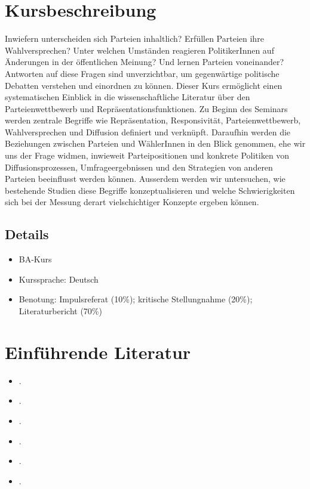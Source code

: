 \documentclass[abstract=on,parskip=full,headings=standardclasses,fontsize=11pt,paper=a4]{scrartcl}
\begin{document}
\section*{Kursbeschreibung}

Inwiefern unterscheiden sich Parteien inhaltlich? Erfüllen Parteien ihre Wahlversprechen? Unter welchen Umständen reagieren PolitikerInnen auf Änderungen in der öffentlichen Meinung? Und lernen Parteien voneinander? Antworten auf diese Fragen sind unverzichtbar, um gegenwärtige politische Debatten verstehen und einordnen zu können. Dieser Kurs ermöglicht einen systematischen Einblick in die wissenschaftliche Literatur über den Parteienwettbewerb und Repräsentationsfunktionen. Zu Beginn des Seminars werden zentrale Begriffe wie Repräsentation, Responsivität, Parteienwettbewerb, Wahlversprechen und Diffusion definiert und verknüpft. Daraufhin werden die Beziehungen zwischen Parteien und WählerInnen in den Blick genommen, ehe wir uns der Frage widmen, inwieweit Parteipositionen und konkrete Politiken von Diffusionsprozessen, Umfrageergebnissen und den Strategien von anderen Parteien beeinflusst werden können. Ausserdem werden wir untersuchen, wie bestehende Studien diese Begriffe konzeptualisieren und welche Schwierigkeiten sich bei der Messung derart vielschichtiger Konzepte ergeben können.

\subsection*{Details}

\begin{itemize}
\item BA-Kurs
\item  Kurssprache: Deutsch
\item Benotung: Impulsreferat (10\%); kritische Stellungnahme (20\%); Literaturbericht (70\%)
\end{itemize}



\section*{Einführende Literatur}

\begin{itemize}
\item {}.
\item {}.
\item {}.
\item {}.
\item {}.
\item {}.
\end{itemize}
\end{document}

